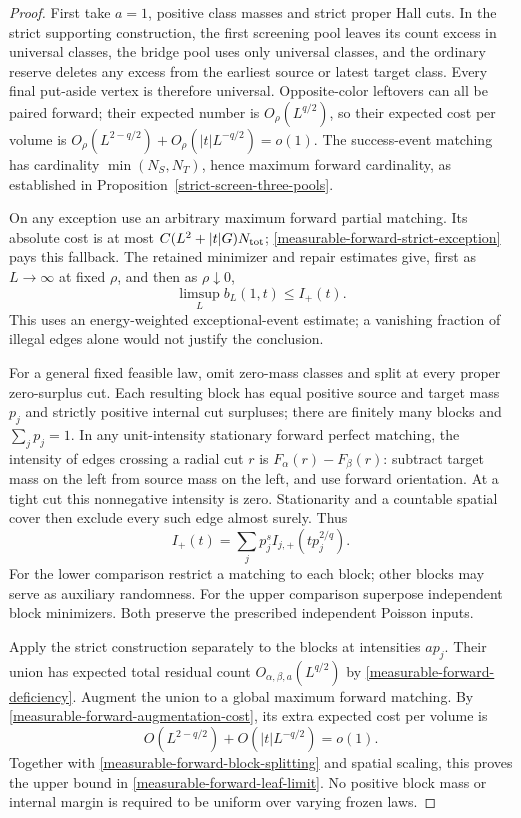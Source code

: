 \documentclass[11pt,reqno]{amsart}
\theoremstyle{definition}
\theoremstyle{remark}
\numberwithin{equation}{section}
\begin{document}
\begin{proof}
First take \(a=1\), positive class masses and strict proper Hall cuts.
In the strict supporting construction, the first screening pool leaves
its count excess in universal classes, the bridge pool uses only universal
classes, and the ordinary reserve deletes any excess from the earliest
source or latest target class. Every final put-aside vertex is therefore
universal. Opposite-color leftovers can all be paired forward; their
expected number is \(O_\rho(L^{q/2})\), so their expected cost per
volume is \(O_\rho(L^{2-q/2})+O_\rho(|t|L^{-q/2})=o(1)\).
The success-event matching has cardinality \(\min(N_S,N_T)\),
hence maximum forward cardinality, as established in
Proposition~\ref{strict-screen-three-pools}.

On any exception use an arbitrary maximum forward partial matching.
Its absolute cost is at most \(C(L^2+|t|G)N_{\rm tot}\);
\eqref{measurable-forward-strict-exception} pays this fallback.
The retained minimizer and repair estimates give, first as \(L\to\infty\)
at fixed \(\rho\), and then as \(\rho\downarrow0\),
\[
                    \limsup_L b_L(1,t)\le I_+(t).
\]
This uses an energy-weighted exceptional-event estimate; a vanishing
fraction of illegal edges alone would not justify the conclusion.

For a general fixed feasible law, omit zero-mass classes and split at
every proper zero-surplus cut. Each resulting block has equal positive
source and target mass \(p_j\) and strictly positive internal cut
surpluses; there are finitely many blocks and \(\sum_jp_j=1\).
In any unit-intensity stationary forward perfect matching, the intensity
of edges crossing a radial cut \(r\) is
\(F_\alpha(r)-F_\beta(r)\): subtract target mass on the left from source
mass on the left, and use forward orientation. At a tight cut this
nonnegative intensity is zero. Stationarity and a countable spatial
cover then exclude every such edge almost surely. Thus
\begin{equation}
\label{measurable-forward-block-splitting}
 I_+(t)=\sum_j p_j^s I_{j,+}(t p_j^{2/q}).
\end{equation}
For the lower comparison restrict a matching to each block; other blocks
may serve as auxiliary randomness. For the upper comparison superpose
independent block minimizers. Both preserve the prescribed independent
Poisson inputs.

Apply the strict construction separately to the blocks at intensities
\(a p_j\). Their union has expected total residual count
\(O_{\alpha,\beta,a}(L^{q/2})\) by
\eqref{measurable-forward-deficiency}. Augment the union to a global
maximum forward matching. By
\eqref{measurable-forward-augmentation-cost}, its extra expected cost
per volume is
\[
                  O(L^{2-q/2})+O(|t|L^{-q/2})=o(1).
\]
Together with \eqref{measurable-forward-block-splitting} and spatial
scaling, this proves the upper bound in
\eqref{measurable-forward-leaf-limit}. No positive block mass or
internal margin is required to be uniform over varying frozen laws.


\end{proof}
\end{document}
